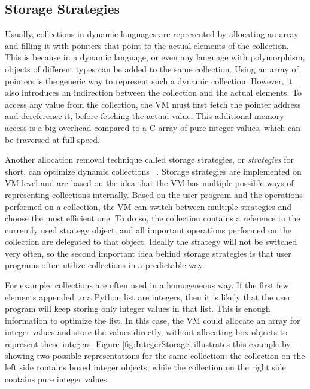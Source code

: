 \documentclass[english,10pt]{sigplanconf}
\begin{document}
\subsection*{Storage Strategies}
\label{cha:storageStrategies}

Usually, collections in dynamic languages are represented by
allocating an array and filling it with pointers that point to the
actual elements of the collection.  This is because in a dynamic
language, or even any language with polymorphism, objects of different
types can be added to the same collection.  Using an array of pointers
is the generic way to represent such a dynamic collection.  However,
it also introduces an indirection between the collection and the
actual elements.  To access any value from the collection, the VM must
first fetch the pointer address and dereference it, before fetching
the actual value.  This additional memory access is a big overhead
compared to a C array of pure integer values, which  can be
traversed at full speed.

Another allocation removal technique called storage strategies, or
\emph{strategies} for short, can optimize dynamic collections%
~\cite{strategies}.  Storage strategies are implemented on VM level and
are based on the idea that the VM has multiple possible ways of
representing collections internally.  Based on the user program
and the operations performed on a collection, the VM can switch
between multiple strategies and choose the most efficient one.  To do
so, the collection contains a reference to the currently used strategy
object, and all important operations performed on the collection are
delegated to that object.  Ideally the strategy will not be switched
very often, so the second important idea behind storage strategies is
that user programs often utilize collections in a predictable way.

For example, collections are often used in a homogeneous way.  If the
first few elements appended to a Python list are integers, then it is
likely that the user program will keep storing only integer values in
that list.  This is enough information to optimize the list.  In this
case, the VM could allocate an array for integer values and store the
values directly, without allocating box objects to represent these
integers.  Figure \ref{fig:IntegerStorage} illustrates this example by
showing two possible representations for the same collection: the
collection on the left side contains boxed integer objects, while the
collection on the right side contains pure integer values.
\end{document}
